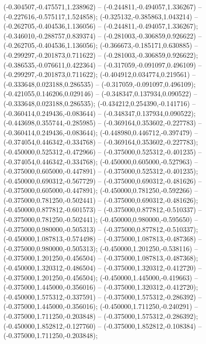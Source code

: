  (-0.304507,-0.475571,1.238962) -- (-0.244811,-0.494057,1.336267) -- (-0.227616,-0.575117,1.524858);
 (-0.325132,-0.385863,1.043214) -- (-0.262705,-0.404536,1.136056) -- (-0.244811,-0.494057,1.336267);
 (-0.346010,-0.288757,0.839374) -- (-0.281003,-0.306859,0.926622) -- (-0.262705,-0.404536,1.136056);
 (-0.366673,-0.185171,0.630885) -- (-0.299297,-0.201873,0.711622) -- (-0.281003,-0.306859,0.926622);
 (-0.386535,-0.076611,0.422364) -- (-0.317059,-0.091097,0.496109) -- (-0.299297,-0.201873,0.711622);
 (-0.404912,0.034774,0.219561) -- (-0.333648,0.023188,0.286535) -- (-0.317059,-0.091097,0.496109);
 (-0.421055,0.146206,0.029146) -- (-0.348347,0.137934,0.090522) -- (-0.333648,0.023188,0.286535);
 (-0.434212,0.254390,-0.141716) -- (-0.360414,0.249436,-0.083644) -- (-0.348347,0.137934,0.090522);
 (-0.443698,0.355744,-0.285985) -- (-0.369164,0.353602,-0.227783) -- (-0.360414,0.249436,-0.083644);
 (-0.448980,0.446712,-0.397479) -- (-0.374054,0.446342,-0.334768) -- (-0.369164,0.353602,-0.227783);
 (-0.450000,0.525312,-0.472966) -- (-0.375000,0.525312,-0.401235) -- (-0.374054,0.446342,-0.334768);
 (-0.450000,0.605000,-0.527963) -- (-0.375000,0.605000,-0.447891) -- (-0.375000,0.525312,-0.401235);
 (-0.450000,0.690312,-0.567729) -- (-0.375000,0.690312,-0.481626) -- (-0.375000,0.605000,-0.447891);
 (-0.450000,0.781250,-0.592266) -- (-0.375000,0.781250,-0.502441) -- (-0.375000,0.690312,-0.481626);
 (-0.450000,0.877812,-0.601573) -- (-0.375000,0.877812,-0.510337) -- (-0.375000,0.781250,-0.502441);
 (-0.450000,0.980000,-0.595650) -- (-0.375000,0.980000,-0.505313) -- (-0.375000,0.877812,-0.510337);
 (-0.450000,1.087813,-0.574498) -- (-0.375000,1.087813,-0.487368) -- (-0.375000,0.980000,-0.505313);
 (-0.450000,1.201250,-0.538116) -- (-0.375000,1.201250,-0.456504) -- (-0.375000,1.087813,-0.487368);
 (-0.450000,1.320312,-0.486504) -- (-0.375000,1.320312,-0.412720) -- (-0.375000,1.201250,-0.456504);
 (-0.450000,1.445000,-0.419663) -- (-0.375000,1.445000,-0.356016) -- (-0.375000,1.320312,-0.412720);
 (-0.450000,1.575312,-0.337591) -- (-0.375000,1.575312,-0.286392) -- (-0.375000,1.445000,-0.356016);
 (-0.450000,1.711250,-0.240291) -- (-0.375000,1.711250,-0.203848) -- (-0.375000,1.575312,-0.286392);
 (-0.450000,1.852812,-0.127760) -- (-0.375000,1.852812,-0.108384) -- (-0.375000,1.711250,-0.203848);
